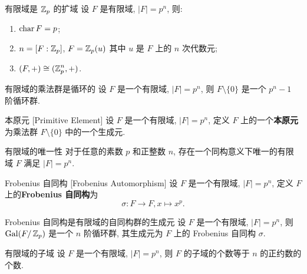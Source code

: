         \begin{thm}
            {有限域是 \(\operatorname{\mathbb{Z}}_p\) 的扩域}
            设 \(F\) 是有限域, \(|F|=p^n\), 则:
            \begin{enumerate}
                \item \(\operatorname{char} F=p\);
                \item \(n=[F:\operatorname{\mathbb{Z}}_p]\), \(F=\operatorname{\mathbb{Z}}_p(u)\) 其中 \(u\) 是 \(F\) 上的 \(n\) 次代数元;
                \item \((F,+)\cong (\operatorname{\mathbb{Z}}_p^n,+)\).
            \end{enumerate}
        \end{thm}

        \begin{thm}
            {有限域的乘法群是循环的}
            设 \(F\) 是一个有限域, \(|F|=p^n\), 则 \(F\setminus\{0\}\) 是一个 \(p^n-1\) 阶循环群.
        \end{thm}

        \begin{dfn}
            {本原元}
            [Primitive Element]
            设 \(F\) 是一个有限域, \(|F|=p^n\), 定义 \(F\) 上的一个\textbf{本原元}为乘法群 \(F\setminus\{0\}\) 中的一个生成元.
        \end{dfn}

        \begin{thm}
            {有限域的唯一性}
            对于任意的素数 \(p\) 和正整数 \(n\), 存在一个同构意义下唯一的有限域 \(F\) 满足 \(|F|=p^n\).
        \end{thm}

        \begin{dfn}
            {Frobenius 自同构}
            [Frobenius Automorphism]
            设 \(F\) 是一个有限域, \(|F|=p^n\), 定义 \(F\) 上的\textbf{Frobenius 自同构}为
            \[\sigma:F\to F, x\mapsto x^p.\]
        \end{dfn}

        \begin{thm}
            {Frobenius 自同构是有限域的自同构群的生成元}
            设 \(F\) 是一个有限域, \(|F|=p^n\), 则 \(\operatorname{Gal}(F/\operatorname{\mathbb{Z}}_p)\) 是一个 \(n\) 阶循环群, 其生成元为 \(F\) 上的 Frobenius 自同构 \(\sigma\).
        \end{thm}

        \begin{thm}
            {有限域的子域}
            设 \(F\) 是一个有限域, \(|F|=p^n\), 则 \(F\) 的子域的个数等于 \(n\) 的正约数的个数.
        \end{thm}

